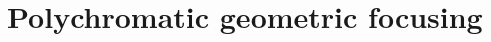 \documentclass[preprint]{iucr}              %
\begin{document}
\section{Polychromatic geometric focusing}
\label{sec:polychromatic}
%
\end{document}
